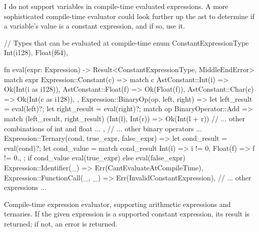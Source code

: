 \documentclass[../00-main.tex]{subfiles}
\begin{document}
I do not support variables in compile-time evaluated expressions.
A more sophisticated compile-time evaluator could look further up the \gls{ast} to determine if a variable's value is a constant expression, and if so, use it.

\begin{listing}[!p]
  \begin{RustListing}
    // Types that can be evaluated at compile-time
    enum ConstantExpressionType {
        Int(i128),
        Float(f64),
    }

    fn eval(expr: Expression) -> Result<ConstantExpressionType, MiddleEndError> {
        match expr {
            Expression::Constant(c) => match c {
                AstConstant::Int(i) => Ok(Int(i as i128)),
                AstConstant::Float(f) => Ok(Float(f)),
                AstConstant::Char(c) => Ok(Int(c as i128)),
            },
            Expression::BinaryOp(op, left, right) => {
                let left_result = eval(left)?;
                let right_result = eval(right)?;
                match op {
                    BinaryOperator::Add => match (left_result, right_result) {
                        (Int(l), Int(r)) => {
                            Ok(Int(l + r))
                        }
                        // ... other combinations of int and float ...
                    },
                    // ... other binary operators ...
                }
            }
            Expression::Ternary(cond, true_expr, false_expr) => {
                let cond_result = eval(cond)?;
                let cond_value = match cond_result {
                    Int(i) => i != 0,
                    Float(f) => f != 0.,
                };
                if cond_value {
                    eval(true_expr)
                } else {
                    eval(false_expr)
                }
            }
            Expression::Identifier(_) => Err(CantEvaluateAtCompileTime),
            Expression::FunctionCall(_, _) => Err(InvalidConstantExpression),
            // ... other expressions ...
        }
    }
  \end{RustListing}
  \caption{Compile-time expression evaluator, supporting arithmetic expressions and ternaries. If the given expression is a supported constant expression, its result is returned; if not, an error is returned.}
  \label{app:lst:compile time expression evaluator}
\end{listing}
\end{document}
